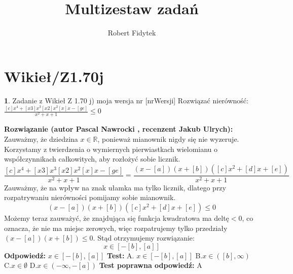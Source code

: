 \documentclass[12pt, a4paper]{article}
\title{Multizestaw zadań}
\author{Robert Fidytek}
\date{}
\theoremstyle{definition} %
\newtheorem{zad}{}
\newcommand{\kategoria}[1]{\section{#1}} %
\newcommand{\zadStart}[1]{\begin{zad}#1\newline} %
\newcommand{\zadStop}{\end{zad}}   %
\newcommand{\rozwStart}[2]{\noindent \textbf{Rozwiązanie (autor #1 , recenzent #2): }\newline} %
\newcommand{\rozwStop}{\newline}                                            %
\newcommand{\odpStart}{\noindent \textbf{Odpowiedź:}\newline}    %
\newcommand{\odpStop}{\newline}                                             %
\newcommand{\testStart}{\noindent \textbf{Test:}\newline} %
\newcommand{\testStop}{\newline} %
\newcommand{\kluczStart}{\noindent \textbf{Test poprawna odpowiedź:}\newline} %
\newcommand{\kluczStop}{\newline} %
\begin{document}
\maketitle


\kategoria{Wikieł/Z1.70j}
\zadStart{Zadanie z Wikieł Z 1.70 j) moja wersja nr [nrWersji]}
Rozwiązać nierówność: $\frac{[c]x^4+[x3]x^3[x2]x^2[x]x-[ge]}{x^2+x+1}\leq0$
\zadStop
\rozwStart{Pascal Nawrocki}{Jakub Ulrych}
Zauważmy, że dziedzina $x\in\mathbb R$, ponieważ mianownik nigdy się nie wyzeruje. Korzystamy z twierdzenia o wymiernych pierwiastkach wielomianu o współczynnikach całkowitych, aby rozłożyć sobie licznik.
$$\frac{[c]x^4+[x3]x^3[x2]x^2[x]x-[ge]}{x^2+x+1}=\frac{(x-[a])(x+[b])([c]x^2+[d]x+[e])}{x^2+x+1}$$
Zauważmy, że na wpływ na znak ułamka ma tylko licznik, dlatego przy rozpatrywaniu nierówności pomijamy sobie mianownik.
$$(x-[a])(x+[b])([c]x^2+[d]x+[e])\leq0$$
Możemy teraz zauważyć, że znajdująca się funkcja kwadratowa ma deltę$<0$, co oznacza, że nie ma miejsc zerowych, więc rozpatrujemy tylko przedziały $(x-[a])(x+[b])\leq0$.
Stąd otrzymujemy rozwiązanie:
$$x\in[-[b],[a]]$$
\rozwStop
\odpStart
$x\in[-[b],[a]]$
\odpStop
\testStart
A. $x\in[-[b],[a]]$
B.$x\in([b],\infty)$
C.$x\in\emptyset$
D.$x\in(-\infty,-[a])$
\testStop
\kluczStart
A
\kluczStop
\end{document}
